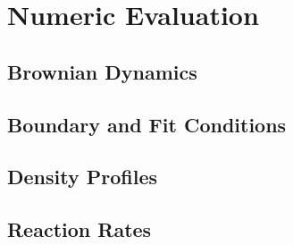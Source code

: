 \section{Numeric Evaluation}
\subsection{Brownian Dynamics}
\subsection{Boundary and Fit Conditions}
\subsection{Density Profiles}
\subsection{Reaction Rates}
